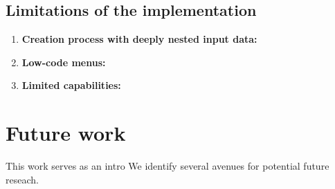 \subsection{Limitations of the implementation}
\begin{enumerate}
	\item \textbf{Creation process with deeply nested input data:}
	\item \textbf{Low-code menus:}
	\item \textbf{Limited capabilities:}
\end{enumerate}


\section{Future work}
This work serves as an intro
We identify several avenues for potential future reseach.
